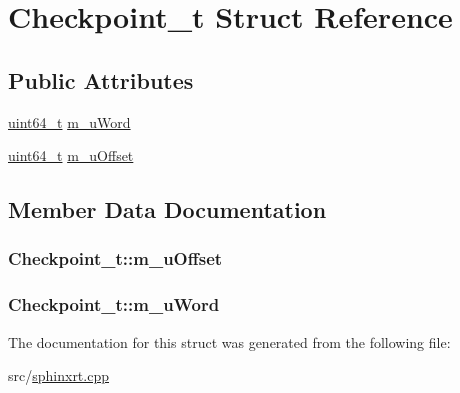 \hypertarget{structCheckpoint__t}{\section{Checkpoint\-\_\-t Struct Reference}
\label{structCheckpoint__t}
}
\subsection*{Public Attributes}
\begin{DoxyCompactItemize}
\item 
\hyperlink{sphinxstd_8h_aaa5d1cd013383c889537491c3cfd9aad}{uint64\-\_\-t} \hyperlink{structCheckpoint__t_ab3c94c77702390156b0db4bae5a20ecf}{m\-\_\-u\-Word}
\item 
\hyperlink{sphinxstd_8h_aaa5d1cd013383c889537491c3cfd9aad}{uint64\-\_\-t} \hyperlink{structCheckpoint__t_a6e16a71bb004c086982df21e51a6a014}{m\-\_\-u\-Offset}
\end{DoxyCompactItemize}


\subsection{Member Data Documentation}
\hypertarget{structCheckpoint__t_a6e16a71bb004c086982df21e51a6a014}{
\subsubsection[{m\-\_\-u\-Offset}]{ Checkpoint\-\_\-t\-::m\-\_\-u\-Offset}}\label{structCheckpoint__t_a6e16a71bb004c086982df21e51a6a014}
\hypertarget{structCheckpoint__t_ab3c94c77702390156b0db4bae5a20ecf}{
\subsubsection[{m\-\_\-u\-Word}]{ Checkpoint\-\_\-t\-::m\-\_\-u\-Word}}\label{structCheckpoint__t_ab3c94c77702390156b0db4bae5a20ecf}


The documentation for this struct was generated from the following file\-:\begin{DoxyCompactItemize}
\item 
src/\hyperlink{sphinxrt_8cpp}{sphinxrt.\-cpp}\end{DoxyCompactItemize}
